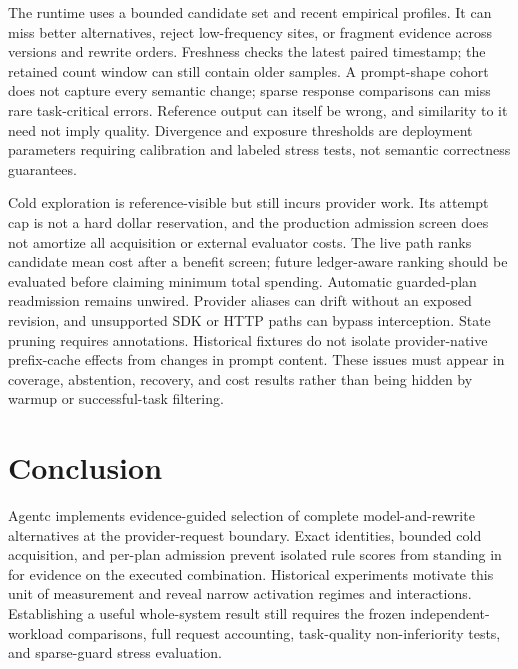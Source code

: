 The runtime uses a bounded candidate set and recent empirical profiles. It can miss
better alternatives, reject low-frequency sites, or fragment evidence across versions
and rewrite orders. Freshness checks the latest paired timestamp; the retained
count window can still contain older samples. A prompt-shape cohort does not capture
every semantic change; sparse response comparisons can miss rare task-critical errors. Reference output
can itself be wrong, and similarity to it need not imply quality. Divergence and
exposure thresholds are deployment parameters requiring calibration and labeled
stress tests, not semantic correctness guarantees.

Cold exploration is reference-visible but still incurs provider work. Its attempt
cap is not a hard dollar reservation, and the production admission screen does not
amortize all acquisition or external evaluator costs. The live path ranks candidate
mean cost after a benefit screen; future ledger-aware ranking should be evaluated
before claiming minimum total spending. Automatic guarded-plan readmission remains
unwired. Provider aliases can drift without an exposed revision, and unsupported
SDK or HTTP paths can bypass interception. State pruning requires annotations.
Historical fixtures do not isolate provider-native prefix-cache effects from
changes in prompt content.
These issues must appear in coverage, abstention, recovery, and cost results rather
than being hidden by warmup or successful-task filtering.

\section{Conclusion}
\label{sec:conclusion}

Agentc implements evidence-guided selection of complete model-and-rewrite alternatives
at the provider-request boundary. Exact identities, bounded cold acquisition, and
per-plan admission prevent isolated rule scores from standing in for evidence on
the executed combination. Historical experiments motivate this unit of measurement
and reveal narrow activation regimes and interactions. Establishing a useful
whole-system result still requires the frozen independent-workload comparisons,
full request accounting, task-quality non-inferiority tests, and sparse-guard stress
evaluation.

\clearpage
\label{page:references-start}




